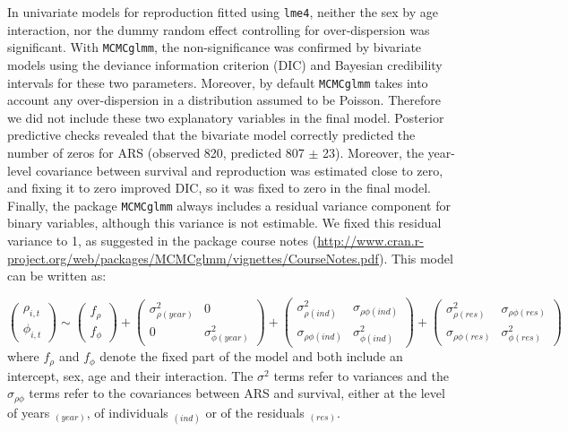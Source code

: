 In univariate models for reproduction fitted using \verb+lme4+, neither the sex by age interaction, nor the dummy random effect controlling for over-dispersion was significant. With \verb+MCMCglmm+, the non-significance was confirmed by bivariate models using the deviance information criterion (DIC) and Bayesian credibility intervals for these two parameters. Moreover, by default \verb+MCMCglmm+ takes into account any over-dispersion in a distribution assumed to be Poisson. Therefore we did not include these two explanatory variables in the final model. Posterior predictive checks revealed that the bivariate model correctly predicted the number of zeros for ARS (observed 820, predicted 807 $\pm$ 23). Moreover, the year-level covariance between survival and reproduction was estimated close to zero, and fixing it to zero improved DIC, so it was fixed to zero in the final model. Finally, the package \verb+MCMCglmm+ always includes a residual variance component for binary variables, although this variance is not estimable. We fixed this residual variance to 1, as suggested in the package course notes (\url{http://www.cran.r-project.org/web/packages/MCMCglmm/vignettes/CourseNotes.pdf}).
This model can be written as:

\begin{equation*}
	\begin{pmatrix}
	\rho_{i,t}\\
	\phi_{i,t}
		\end{pmatrix}
		\sim	
	\begin{pmatrix}
	f_{\rho}\\
	f_{\phi}
	\end{pmatrix}	
	+
	\begin{pmatrix}
	\sigma_{\rho (year)}^2 & 0\\
	0 & \sigma_{\phi (year)}^2
	\end{pmatrix}	
	+
	\begin{pmatrix}
	\sigma_{\rho (ind)}^2 & \sigma_{\rho \phi (ind)}\\
	\sigma_{\rho \phi (ind)} & \sigma_{\phi (ind)}^2
	\end{pmatrix}	
	+
	\begin{pmatrix}
	\sigma_{\rho (res)}^2 & \sigma_{\rho \phi (res)}\\
	\sigma_{\rho \phi (res)} & \sigma_{\phi (res)}^2
	\end{pmatrix}	
\end{equation*}
where $f_{\rho}$ and $f_{\phi}$ denote the fixed part of the model and both include an intercept, sex, age and their interaction. The $\sigma^2$ terms refer to variances and the $\sigma_{\rho \phi}$ terms refer to the covariances between ARS and survival, either at the level of years $_{(year)}$, of individuals $_{(ind)}$ or of the residuals $_{(res)}$.

